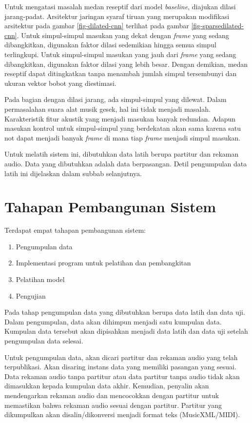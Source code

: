 Untuk mengatasi masalah medan reseptif dari model \textit{baseline}, diajukan dilasi jarang-padat. Arsitektur jaringan syaraf tiruan yang merupakan modifikasi arsitektur pada gambar \ref{fig-dilated-cnn} terlihat pada gambar \ref{fig-sparsedilated-cnn}. Untuk simpul-simpul masukan yang dekat dengan \textit{frame} yang sedang dibangkitkan, digunakan faktor dilasi sedemikian hingga semua simpul terlingkupi. Untuk simpul-simpul masukan yang jauh dari \textit{frame} yang sedang dibangkitkan, digunakan faktor dilasi yang lebih besar. Dengan demikian, medan reseptif dapat ditingkatkan tanpa menambah jumlah simpul tersembunyi dan ukuran vektor bobot yang diestimasi.

Pada bagian dengan dilasi jarang, ada simpul-simpul yang dilewat. Dalam permasalahan suara alat musik gesek, hal ini tidak menjadi masalah. Karakteristik fitur akustik yang menjadi masukan banyak redundan. Adapun masukan kontrol untuk simpul-simpul yang berdekatan akan sama karena satu not dapat menjadi banyak \textit{frame} di mana tiap \textit{frame} menjadi simpul masukan.

Untuk melatih sistem ini, dibutuhkan data latih berupa partitur dan rekaman audio. Data yang dibutuhkan adalah data berpasangan. Detil pengumpulan data latih ini dijelaskan dalam subbab selanjutnya.

\section{Tahapan Pembangunan Sistem}

Terdapat empat tahapan pembangunan sistem:

\begin{enumerate}
    \item Pengumpulan data
    \item Implementasi program untuk pelatihan dan pembangkitan
    \item Pelatihan model
    \item Pengujian
\end{enumerate}

Pada tahap pengumpulan data yang dibutuhkan berupa data latih dan data uji. Dalam pengumpulan, data akan dihimpun menjadi satu kumpulan data. Kumpulan data tersebut akan dipisahkan menjadi data latih dan data uji setelah pengumpulan data selesai.

Untuk pengumpulan data, akan dicari partitur dan rekaman audio yang telah terpublikasi. Akan disaring instans data yang memiliki pasangan yang sesuai. Data rekaman audio tanpa partitur atau data partitur tanpa audio tidak akan dimasukkan kepada kumpulan data akhir. Kemudian, penyalin akan mendengarkan rekaman audio dan mencocokkan dengan partitur untuk memastikan bahwa rekaman audio sesuai dengan partitur. Partitur yang dikumpulkan akan disalin/dikonversi menjadi format teks (MusicXML/MIDI).

